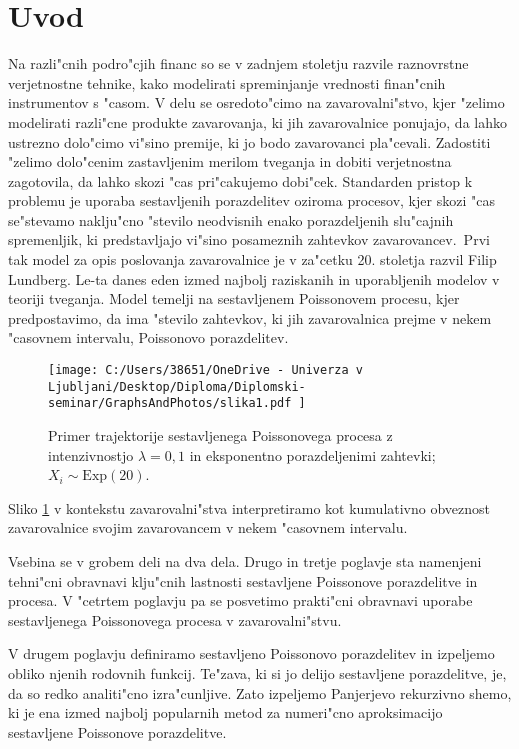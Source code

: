 \documentclass[12pt, a4paper, reqno]{amsart}
\theoremstyle{definition}
\theoremstyle{plain}
\newcommand{\1}{\mathds{1}}
\begin{document}
\section{Uvod}
    Na razli"cnih podro"cjih financ so se v zadnjem stoletju razvile raznovrstne verjetnostne tehnike, kako 
    modelirati spreminjanje vrednosti finan"cnih instrumentov s "casom. V delu se osredoto"cimo na zavarovalni"stvo, 
    kjer "zelimo modelirati razli"cne produkte zavarovanja, ki jih zavarovalnice ponujajo, da lahko ustrezno dolo"cimo vi"sino premije, ki jo
    bodo zavarovanci pla"cevali. Zadostiti "zelimo dolo"cenim zastavljenim merilom tveganja in dobiti verjetnostna zagotovila, 
    da lahko skozi "cas pri"cakujemo dobi"cek. 
    Standarden pristop k problemu je uporaba sestavljenih porazdelitev oziroma procesov, kjer skozi "cas se"stevamo naklju"cno "stevilo 
    neodvisnih enako porazdeljenih slu"cajnih spremenljik, ki predstavljajo vi"sino posameznih zahtevkov zavarovancev.\ Prvi tak model za opis
    poslovanja zavarovalnice 
    je v za"cetku 20. stoletja razvil Filip Lundberg. Le-ta danes eden izmed najbolj raziskanih in 
    uporabljenih modelov v teoriji tveganja. Model temelji na sestavljenem Poissonovem procesu, kjer predpostavimo, da ima "stevilo zahtevkov,
    ki jih zavarovalnica prejme v nekem "casovnem intervalu, Poissonovo porazdelitev.

    \begin{figure}[H]
        \centering
        \texttt{[image: 
            C:/Users/38651/OneDrive - Univerza v Ljubljani/Desktop/Diploma/Diplomski-seminar/GraphsAndPhotos/slika1.pdf
            ]}
        \caption{Primer trajektorije sestavljenega Poissonovega procesa z intenzivnostjo $\lambda = 0{,}1$ in
        eksponentno porazdeljenimi zahtevki; $X_i\sim\text{Exp}(20)$.}
        \label{fig:slika1}
    \end{figure}
    \noindent
    Sliko \ref{fig:slika1} v kontekstu zavarovalni"stva interpretiramo kot kumulativno obveznost zavarovalnice 
    svojim zavarovancem v nekem "casovnem intervalu. 

    Vsebina se v grobem deli na dva dela. Drugo in tretje poglavje sta namenjeni tehni"cni obravnavi klju"cnih lastnosti 
    sestavljene Poissonove porazdelitve in procesa. V "cetrtem poglavju pa se posvetimo prakti"cni obravnavi uporabe sestavljenega
    Poissonovega procesa v zavarovalni"stvu. 

    V drugem poglavju definiramo sestavljeno Poissonovo porazdelitev in izpeljemo obliko njenih rodovnih funkcij.
    Te"zava, ki si jo delijo sestavljene porazdelitve, je, da so redko analiti"cno izra"cunljive. 
    Zato izpeljemo Panjerjevo rekurzivno shemo, ki 
    je ena izmed najbolj popularnih metod za numeri"cno aproksimacijo sestavljene Poissonove porazdelitve.
\end{document}
